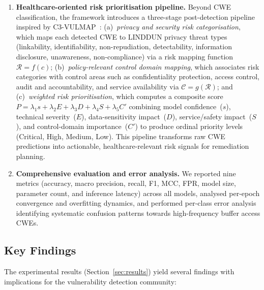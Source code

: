 \begin{enumerate}
    \item \textbf{Healthcare-oriented risk prioritisation pipeline.}
          Beyond CWE classification, the framework introduces a three-stage
          post-detection pipeline inspired by
          C3-VULMAP~\cite{santos2023c3vulmap}:
          (a)~\emph{privacy and security risk categorisation}, which maps
          each detected CWE to LINDDUN privacy threat types (linkability,
          identifiability, non-repudiation, detectability, information
          disclosure, unawareness, non-compliance) via a risk mapping
          function $\mathcal{R} = f(c)$;
          (b)~\emph{policy-relevant control domain mapping}, which
          associates risk categories with control areas such as
          confidentiality protection, access control, audit and
          accountability, and service availability via
          $\mathcal{C} = g(\mathcal{R})$; and
          (c)~\emph{weighted risk prioritisation}, which computes a
          composite score
          $P = \lambda_1 s + \lambda_2 E + \lambda_3 D + \lambda_4 S
          + \lambda_5 C'$
          combining model confidence~($s$), technical severity~($E$),
          data-sensitivity impact~($D$), service/safety impact~($S$),
          and control-domain importance~($C'$) to produce ordinal
          priority levels (Critical, High, Medium, Low).
          This pipeline transforms raw CWE predictions into actionable,
          healthcare-relevant risk signals for remediation planning.

    \item \textbf{Comprehensive evaluation and error analysis.}
          We reported nine metrics (accuracy, macro precision, recall, F1,
          MCC, FPR, model size, parameter count, and inference latency)
          across all models, analysed per-epoch convergence and overfitting
          dynamics, and performed per-class error analysis identifying
          systematic confusion patterns towards high-frequency buffer
          access CWEs.
\end{enumerate}

\subsection{Key Findings}
\label{sec:key_findings}

The experimental results (Section~\ref{sec:results}) yield several findings
with implications for the vulnerability detection community:

